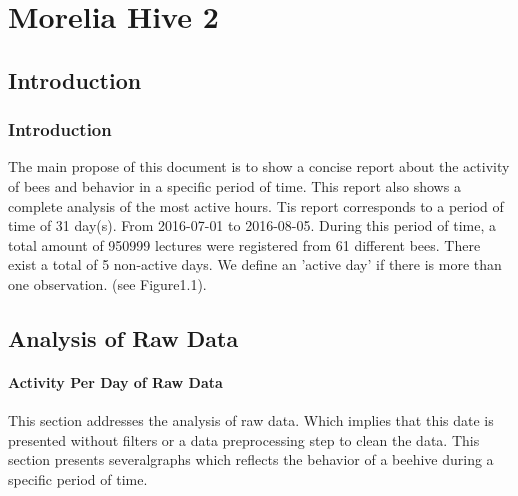 \documentclass[11pt,fleqn]{book} %
\begin{document}


\pagestyle{empty} %

\tableofcontents %


\pagestyle{fancy} %

\part{Morelia Hive 2}
\chapter{Introduction} 
\normalsize%
\section{Introduction}%
\label{sec:Introduction}%
The main propose of this document  is to show a concise report about the activity of bees and behavior in a specific period of time. This report also shows a complete analysis of the most active hours.\newline%
\newline%
Tis report corresponds to a period of time of 31 day(s). From 2016{-}07{-}01 to 2016{-}08{-}05. During this period of time, a total amount of 950999 lectures were registered from 61 different bees. There exist a total of 5 non{-}active days. We define an 'active day' if there is more than one observation. (see Figure1.1).\newline%
\newline%

\chapter{Analysis of Raw Data} 
\normalsize%
\subsection{Activity Per Day of Raw Data}%
\label{subsec:Activity Per Day of Raw Data}%
This section addresses the analysis of raw data. Which implies that this date is presented without filters or a data preprocessing step to clean the data. This section presents severalgraphs which reflects the behavior of a beehive during a specific period of time.%
\end{document}

